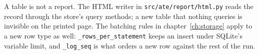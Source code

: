 A table is not a report. The HTML writer in \texttt{src/\allowbreak{}ate/\allowbreak{}report/\allowbreak{}html.py} reads the record through
the store's query methods; a new table that nothing queries is invisible on the printed page. The
batching rules in chapter~\ref{ch:storage} apply to a new row type as well:
\texttt{\_\allowbreak{}rows\_\allowbreak{}per\_\allowbreak{}statement} keeps an insert under SQLite's variable limit, and
\texttt{\_log\_seq} is what orders a new row against the rest of the run.


